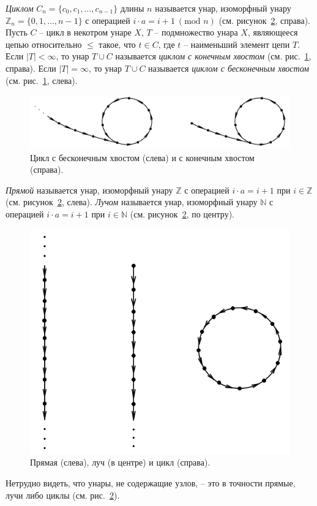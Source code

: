 \documentclass[11pt,twoside,final
]{article}
\begin{document}
\textit{Циклом} $C_n = \{ c_0, c_1, \ldots, c_{n - 1} \}$ длины $n$ называется унар, изоморфный унару $\mathbb{Z}_n = \{ 0, 1, \ldots, n - 1 \}$ с операцией $i \cdot a = i + 1 \ (\textrm{mod } n)$ (см. рисунок~\ref{fig:line_ray_cycle}, справа).
Пусть $C$ -- цикл в некотром унаре $X$, $T$ -- подмножество унара $X$, являющееся цепью относительно $\leqslant$ такое, что $t \in C$, где $t$ -- наименьший элемент цепи $T$.
Если $|T| < \infty$, то унар $T \cup C$ называется \textit{циклом с конечным хвостом} (см. рис.~\ref{fig:tails}, справа).
Если $|T| = \infty$, то унар $T \cup C$ называется \textit{циклом с бесконечным хвостом} (см. рис.~\ref{fig:tails}, слева).
\begin{figure}[ht!]
	\centering
	\includegraphics[scale=0.4]{img/tails.png}
	\caption{Цикл с бесконечным хвостом (слева) и с конечным хвостом (справа).}
	\label{fig:tails}
\end{figure}
\textit{Прямой} называется унар, изоморфный унару $\mathbb{Z}$ с операцией $i \cdot a = i + 1$ при $i \in \mathbb{Z}$ (см. рисунок~\ref{fig:line_ray_cycle}, слева).
\textit{Лучом} называется унар, изоморфный унару $\mathbb{N}$ с операцией $i \cdot a = i + 1$ при $i \in \mathbb{N}$ (см. рисунок~\ref{fig:line_ray_cycle}, по центру).
\begin{figure}[ht!]
	\centering
	\includegraphics[scale=0.5]{img/line_ray_cycle.png}
	\caption{Прямая (слева), луч (в центре) и цикл (справа).}
	\label{fig:line_ray_cycle}
\end{figure}
Нетрудно видеть, что унары, не содержащие узлов, -- это в точности прямые, лучи либо циклы (см. рис.~\ref{fig:line_ray_cycle}).
\end{document}
